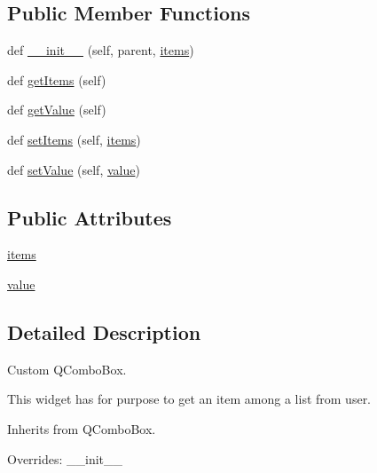 \subsection*{Public Member Functions}
\begin{DoxyCompactItemize}
\item 
def \mbox{\hyperlink{classwindshape_1_1gui_1_1widgets_1_1inputs_1_1_combo_input_1_1_combo_input_a3f2c4f223f67d040812728e4220c3dea}{\+\_\+\+\_\+init\+\_\+\+\_\+}} (self, parent, \mbox{\hyperlink{classwindshape_1_1gui_1_1widgets_1_1inputs_1_1_combo_input_1_1_combo_input_acfe703a6377349666851aaea941c50fc}{items}})
\item 
def \mbox{\hyperlink{classwindshape_1_1gui_1_1widgets_1_1inputs_1_1_combo_input_1_1_combo_input_a56b9fe70568a15e104becdd88d93e44b}{get\+Items}} (self)
\item 
def \mbox{\hyperlink{classwindshape_1_1gui_1_1widgets_1_1inputs_1_1_combo_input_1_1_combo_input_a277126cd460952fff72b86efeaf51dc9}{get\+Value}} (self)
\item 
def \mbox{\hyperlink{classwindshape_1_1gui_1_1widgets_1_1inputs_1_1_combo_input_1_1_combo_input_a6e4f777b5e442a666ca8d5c085bb8858}{set\+Items}} (self, \mbox{\hyperlink{classwindshape_1_1gui_1_1widgets_1_1inputs_1_1_combo_input_1_1_combo_input_acfe703a6377349666851aaea941c50fc}{items}})
\item 
def \mbox{\hyperlink{classwindshape_1_1gui_1_1widgets_1_1inputs_1_1_combo_input_1_1_combo_input_a369ed62e24700499d10ffd993e9960b6}{set\+Value}} (self, \mbox{\hyperlink{classwindshape_1_1gui_1_1widgets_1_1inputs_1_1_combo_input_1_1_combo_input_a73d6f9ac8d1497d6f8a8d5457d3d56d2}{value}})
\end{DoxyCompactItemize}
\subsection*{Public Attributes}
\begin{DoxyCompactItemize}
\item 
\mbox{\hyperlink{classwindshape_1_1gui_1_1widgets_1_1inputs_1_1_combo_input_1_1_combo_input_acfe703a6377349666851aaea941c50fc}{items}}
\item 
\mbox{\hyperlink{classwindshape_1_1gui_1_1widgets_1_1inputs_1_1_combo_input_1_1_combo_input_a73d6f9ac8d1497d6f8a8d5457d3d56d2}{value}}
\end{DoxyCompactItemize}


\subsection{Detailed Description}
\begin{DoxyVerb}Custom QComboBox.

This widget has for purpose to get an item among a list from user.

Inherits from QComboBox.

Overrides: __init__
\end{DoxyVerb}
 


